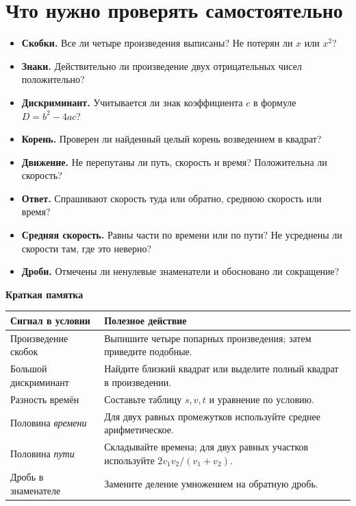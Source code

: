 \documentclass[a4paper,12pt]{article}
\newcommand{\method}[1]{\par\medskip\textcolor{darkaccent}{\textbf{#1}}\par\smallskip}
\begin{document}
\section{Что нужно проверять самостоятельно}

\begin{itemize}[leftmargin=1.8em,itemsep=7pt]
\item \textbf{Скобки.} Все ли четыре произведения выписаны? Не потерян ли $x$ или $x^2$?
\item \textbf{Знаки.} Действительно ли произведение двух отрицательных чисел положительно?
\item \textbf{Дискриминант.} Учитывается ли знак коэффициента $c$ в формуле $D=b^2-4ac$?
\item \textbf{Корень.} Проверен ли найденный целый корень возведением в квадрат?
\item \textbf{Движение.} Не перепутаны ли путь, скорость и время? Положительна ли скорость?
\item \textbf{Ответ.} Спрашивают скорость туда или обратно, среднюю скорость или время?
\item \textbf{Средняя скорость.} Равны части по времени или по пути? Не усреднены ли скорости там, где это неверно?
\item \textbf{Дроби.} Отмечены ли ненулевые знаменатели и обосновано ли сокращение?
\end{itemize}

\method{Краткая памятка}
\begin{center}
\renewcommand{\arraystretch}{1.35}
\begin{tabularx}{\linewidth}{@{}>{\raggedright\arraybackslash}p{.34\linewidth} X@{}}
\toprule
Сигнал в условии & Полезное действие\\
\midrule
Произведение скобок & Выпишите четыре попарных произведения; затем приведите подобные.\\
Большой дискриминант & Найдите близкий квадрат или выделите полный квадрат в произведении.\\
Разность времён & Составьте таблицу $s,v,t$ и уравнение по условию.\\
Половина \emph{времени} & Для двух равных промежутков используйте среднее арифметическое.\\
Половина \emph{пути} & Складывайте времена; для двух равных участков используйте $2v_1v_2/(v_1+v_2)$.\\
Дробь в знаменателе & Замените деление умножением на обратную дробь.\\
\bottomrule
\end{tabularx}
\end{center}
\end{document}
